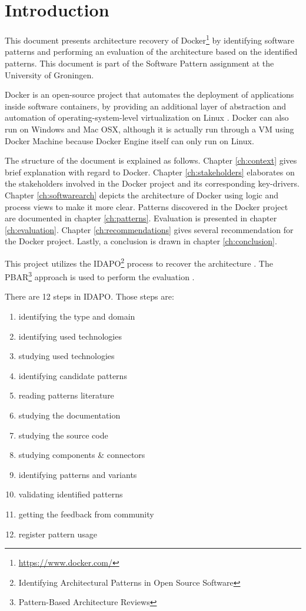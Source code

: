 \clearpage
\chapter{Introduction}
\label{ch:introduction}
This document presents architecture recovery of
Docker\footnote{\url{https://www.docker.com/}} by identifying software patterns
and performing an evaluation of the architecture based on the identified
patterns. This document is part of the Software Pattern assignment at the
University of Groningen.

Docker is an open-source project that automates the deployment of applications
inside software containers, by providing an additional layer of abstraction and
automation of operating-system-level virtualization on Linux \cite{dockerdef}.
Docker can also run on Windows and Mac OSX, although it is actually run through
a VM using Docker Machine because Docker Engine itself can only run on Linux.

The structure of the document is explained as follows. Chapter \ref{ch:context}
gives brief explanation with regard to Docker. Chapter \ref{ch:stakeholders}
elaborates on the stakeholders involved in the Docker project and its
corresponding key-drivers. Chapter \ref{ch:softwarearch} depicts the
architecture of Docker using logic and process views to make it more clear.
Patterns discovered in the Docker project are documented in chapter
\ref{ch:patterns}. Evaluation is presented in chapter \ref{ch:evaluation}.
Chapter \ref{ch:recommendations} gives several recommendation for the Docker
project. Lastly, a conclusion is drawn in chapter \ref{ch:conclusion}.

This project utilizes the IDAPO\footnote{Identifying Architectural Patterns in
Open Source Software} process to recover the architecture \cite{idapo}. The
PBAR\footnote{Pattern-Based Architecture Reviews} approach is used to perform
the evaluation \cite{pbar}.

There are 12 steps in IDAPO. Those steps are:
\begin{enumerate}
\item identifying the type and domain
\item identifying used technologies
\item studying used technologies
\item identifying candidate patterns
\item reading patterns literature
\item studying the documentation
\item studying the source code
\item studying components \& connectors
\item identifying patterns and variants
\item validating identified patterns
\item getting the feedback from community
\item register pattern usage
\end{enumerate}

